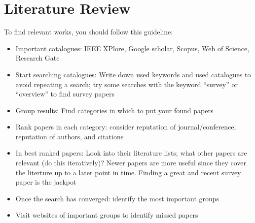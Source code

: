 \chapter{Literature Review} \label{ch:lit_review}

To find relevant works, you should follow this guideline:
\begin{itemize}
\item Important catalogues: IEEE XPlore, Google scholar, Scopus, Web of Science, Research Gate
\item Start searching catalogues: Write down used keywords and used catalogues to avoid repeating a search; try some searches with the keyword ``survey'' or ``overview'' to find survey papers
\item Group results: Find categories in which to put your found papers
\item Rank papers in each category: consider reputation of journal/conference, reputation of authors, and citations 
\item In best ranked papers: Look into their literature lists; what other papers are relevant (do this iteratively)? Newer papers are more useful since they cover the literture up to a later point in time. Finding a great and recent survey paper is the jackpot
\item Once the search has converged: identify the most important groups
\item Visit websites of important groups to identify missed papers
\end{itemize}